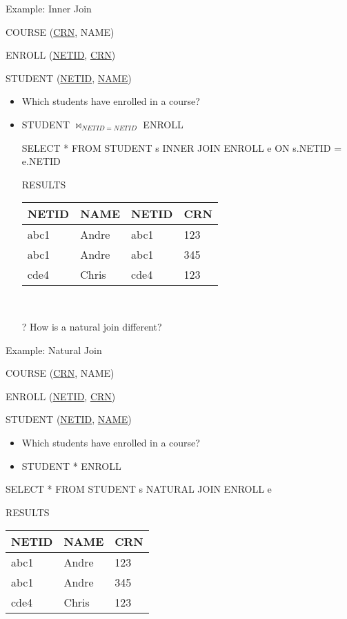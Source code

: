 \documentclass[aspectratio=169]{beamer}
\begin{document}
\begin{frame}[fragile]{Example: Inner Join}

COURSE (\underline{CRN}, NAME)

ENROLL (\underline{NETID}, \underline{CRN})


STUDENT (\underline{NETID}, \underline{NAME})


\begin{itemize}
\item Which students have enrolled in a course?
\item STUDENT $\bowtie_{NETID = NETID}$ ENROLL

\begin{SQL}
SELECT *
FROM STUDENT s INNER JOIN ENROLL e ON s.NETID = e.NETID
\end{SQL}

RESULTS\\
\begin{tabular}{|l|l|l|l|} \hline
\textbf{NETID} & \textbf{NAME} & \textbf{NETID} & \textbf{CRN}\\ \hline
abc1 & Andre & abc1  & 123 \\\hline
abc1 & Andre  & abc1 & 345 \\\hline
cde4 & Chris & cde4 & 123 \\ \hline
\end{tabular}\\
\item[?] How is a natural join different?
\end{itemize}
\end{frame}
\begin{frame}[fragile]{Example: Natural Join}

COURSE (\underline{CRN}, NAME)

ENROLL (\underline{NETID}, \underline{CRN})


STUDENT (\underline{NETID}, \underline{NAME})


\begin{itemize}
\item Which students have enrolled in a course?
\item STUDENT * ENROLL
\end{itemize}

\begin{SQL}
SELECT *
FROM STUDENT s NATURAL JOIN ENROLL e 
\end{SQL}

RESULTS\\
\begin{tabular}{|l|l|l|} \hline
\textbf{NETID} & \textbf{NAME} & \textbf{CRN}\\ \hline
abc1 & Andre   & 123 \\\hline
abc1 & Andre   & 345 \\\hline
cde4 & Chris  & 123 \\ \hline
\end{tabular}\\
\end{frame}
\end{document}
